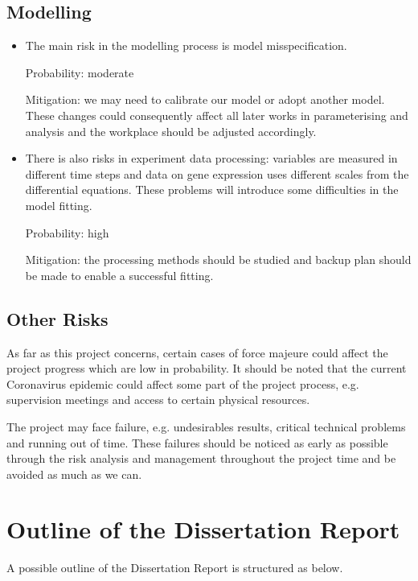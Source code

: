 \documentclass{article}
\begin{document}
\subsection{Modelling}

\begin{itemize}
	\item The main risk in the modelling process is model misspecification. 
	
	Probability: moderate
	
	Mitigation: we may need to calibrate our model or adopt another model. These changes could consequently affect all later works in parameterising and analysis and the workplace should be adjusted accordingly.
	
	\item There is also risks in experiment data processing: variables are measured in different time steps and data on gene expression uses different scales from the differential equations. These problems will introduce some difficulties in the model fitting.
	
	Probability: high
	
	Mitigation: the processing methods should be studied and backup plan should be made to enable a successful fitting.
\end{itemize}

\subsection{Other Risks}

As far as this project concerns, certain cases of force majeure could affect the project progress which are low in probability. It should be noted that the current Coronavirus epidemic could affect some part of the project process, e.g. supervision meetings and access to certain physical resources.

The project may face failure, e.g. undesirables results, critical technical problems and running out of time. These failures should be noticed as early as possible through the risk analysis and management throughout the project time and be avoided as much as we can.

\section{Outline of the Dissertation Report}

A possible outline of the Dissertation Report is structured as below.
\end{document}
